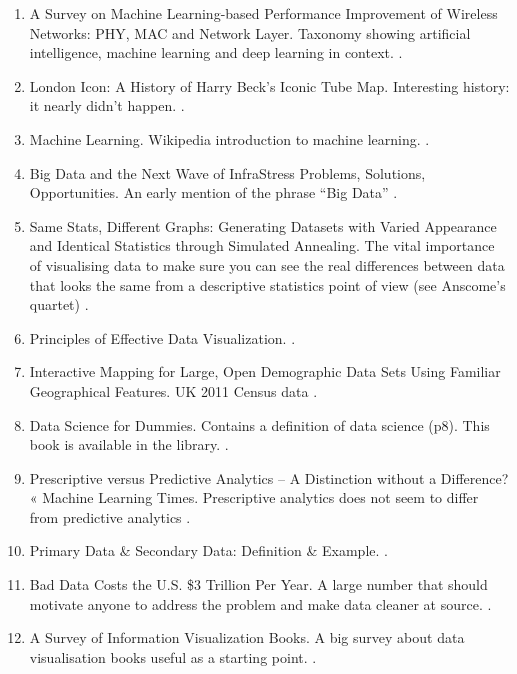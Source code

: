 \documentclass[a4paper]{article}
\begin{document}
\begin{enumerate}
\item A Survey on Machine Learning-based Performance Improvement of Wireless Networks: PHY, MAC and Network Layer. Taxonomy showing artificial intelligence, machine learning and deep learning in context. \parencite{kulinSurveyMachineLearningbased2020}.
\item London Icon: A History of Harry Beck’s Iconic Tube Map. Interesting history: it nearly didn’t happen. \parencite{LondonIconHistory2017}.
\item Machine Learning. Wikipedia introduction to machine learning. \parencite{MachineLearning2022}.
\item Big Data and the Next Wave of InfraStress Problems, Solutions, Opportunities. An early mention of the phrase “Big Data” \parencite{masheyBigDataNext1999}.
\item Same Stats, Different Graphs: Generating Datasets with Varied Appearance and Identical Statistics through Simulated Annealing. The vital importance of visualising data to make sure you can see the real differences between data that looks the same from a descriptive statistics point of view (see Anscome’s quartet) \parencite{matejkaSameStatsDifferent2017}.
\item Principles of Effective Data Visualization.  \parencite{midwayPrinciplesEffectiveData2020}.
\item Interactive Mapping for Large, Open Demographic Data Sets Using Familiar Geographical Features. UK 2011 Census data \parencite{obrienInteractiveMappingLarge2016}.
\item Data Science for Dummies. Contains a definition of data science (p8). This book is available in the library. \parencite{pierson2021data}.
\item Prescriptive versus Predictive Analytics – A Distinction without a Difference? « Machine Learning Times. Prescriptive analytics does not seem to differ from predictive analytics \parencite{PrescriptivePredictiveAnalytics2014}.
\item Primary Data \& Secondary Data: Definition \& Example.  \parencite{PrimaryDataSecondary}.
\item Bad Data Costs the U.S. \$3 Trillion Per Year. A large number that should motivate anyone to address the problem and make data cleaner at source. \parencite{redmanBadDataCosts2016}.
\item A Survey of Information Visualization Books. A big survey about data visualisation books useful as a starting point. \parencite{reesSurveyInformationVisualization2019}.

\end{enumerate}
\end{document}
